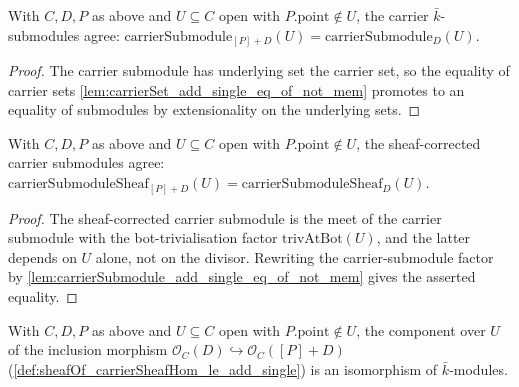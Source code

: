\begin{lemma}
  \label{lem:carrierSubmodule_add_single_eq_of_not_mem}
  With \(C, D, P\) as above and \(U \subseteq C\) open with
  \(P.\mathrm{point} \notin U\), the carrier \(\bar k\)-submodules agree:
  \(\mathrm{carrierSubmodule}_{[P]+D}(U) = \mathrm{carrierSubmodule}_D(U)\).
\end{lemma}

\begin{proof}
  \leanok
  The carrier submodule has underlying set the carrier set, so the equality of
  carrier sets \cref{lem:carrierSet_add_single_eq_of_not_mem} promotes to an
  equality of submodules by extensionality on the underlying sets.
\end{proof}

\begin{lemma}

  \label{lem:carrierSubmoduleSheaf_add_single_eq_of_not_mem}
  With \(C, D, P\) as above and \(U \subseteq C\) open with
  \(P.\mathrm{point} \notin U\), the sheaf-corrected carrier submodules agree:
  \(\mathrm{carrierSubmoduleSheaf}_{[P]+D}(U) =
  \mathrm{carrierSubmoduleSheaf}_D(U)\).
\end{lemma}

\begin{proof}
  \leanok
  The sheaf-corrected carrier submodule is the meet of the carrier submodule
  with the bot-trivialisation factor \(\mathrm{trivAtBot}(U)\), and the latter
  depends on \(U\) alone, not on the divisor. Rewriting the carrier-submodule
  factor by \cref{lem:carrierSubmodule_add_single_eq_of_not_mem} gives the
  asserted equality.
\end{proof}

\begin{lemma}
  \label{lem:carrierPresheaf_le_hom_app_isIso_of_not_mem}
  With \(C, D, P\) as above and \(U \subseteq C\) open with
  \(P.\mathrm{point} \notin U\), the component over \(U\) of the inclusion
  morphism \(\mathcal O_C(D) \hookrightarrow \mathcal O_C([P]+D)\)
  (\cref{def:sheafOf_carrierSheafHom_le_add_single}) is an isomorphism of
  \(\bar k\)-modules.
\end{lemma}

